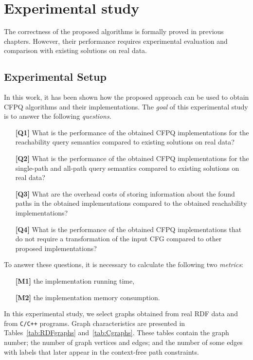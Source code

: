 \chapter{Experimental study}\label{ch:ch5}
The correctness of the proposed algorithms is formally proved in previous chapters. However, their performance requires experimental evaluation and comparison with existing solutions on real data.

\section{Experimental Setup}\label{sec:ch5/sect1}

In this work, it has been shown how the proposed approach can be used to obtain CFPQ algorithms and their implementations. The \textit{goal} of this experimental study is to answer the following \textit{questions}.

\begin{enumerate}
    \item [\textbf{[Q1]}] What is the performance of the obtained CFPQ implementations for the reachability query semantics compared to existing solutions on real data?
    \item [\textbf{[Q2]}] What is the performance of the obtained CFPQ implementations for the single-path and all-path query semantics compared to existing solutions on real data?
    \item [\textbf{[Q3]}] What are the overhead costs of storing information about the found paths in the obtained implementations compared to the obtained reachability implementations?
    \item [\textbf{[Q4]}] What is the performance of the obtained CFPQ implementations that do not require a transformation of the input CFG compared to other proposed implementations?
\end{enumerate}

To answer these questions, it is necessary to calculate the following two
\textit{metrics}:

\begin{enumerate}
    \item [\textbf{[M1]}] the implementation running time,
    \item [\textbf{[M2]}] the implementation memory consumption.
\end{enumerate}

In this experimental study, we select graphs obtained from real RDF data and from \texttt{C/C++} programs. Graph characteristics are presented in Tables~\ref{tab:RDFgraphs} and~\ref{tab:Cgraphs}. These tables contain the graph number; the number of graph vertices and edges; and the number of some edges with labels that later appear in the context-free path constraints.

